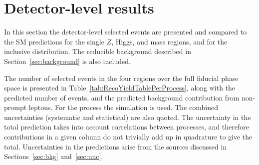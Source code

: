 \section{Detector-level results}
\label{sec:m4lrecoresults}
In this section the detector-level selected events are presented and compared to the SM predictions for the single $Z$, Higgs, \onshellZZ and \offshellZZ mass regions, and for the inclusive \mFourL{} distribution. The reducible background described in Section~\ref{sec:background} is also included. 

The number of selected events in the four \mFourL{} regions over the full fiducial phase space is presented in Table~\ref{tab:RecoYieldTablePerProcess}, along with the predicted number of events, and the predicted background contribution from non-prompt leptons. For the \qqFourL{} process the \SHERPA{} simulation is used. The combined uncertainties (systematic and statistical) are also quoted. The uncertainty in the total prediction takes into account correlations between processes, and therefore contributions in a given column do not trivially add up in quadrature to give the total. Uncertainties in the predictions arise from the sources discussed in Sections~\ref{sec:bkg} and~\ref{sec:unc}. 

